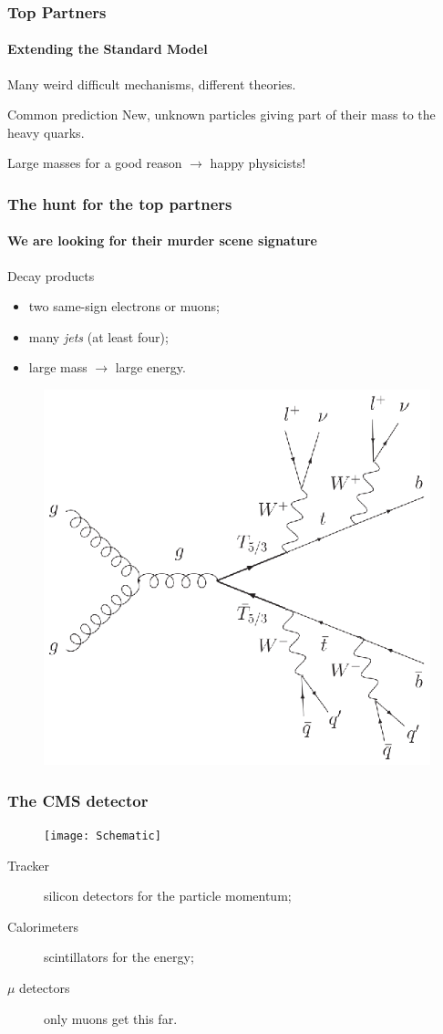 \documentclass[ukenglish]{beamer}
\begin{document}
\begin{frame}
    \frametitle{Top Partners}
    \framesubtitle{Extending the Standard Model}

    Many weird difficult mechanisms, different theories. 
    \begin{block}
        {Common prediction}
        New, unknown particles giving part of their mass to the heavy
        quarks.
    \end{block}
    Large masses for a good reason $\longrightarrow$ happy physicists!
\end{frame}

\begin{frame}
    \frametitle{The hunt for the top partners}
    \framesubtitle{We are looking for their murder scene signature}
    \begin{block}
        {Decay products}
        \begin{itemize}
            \item two same-sign electrons or muons;
            \item many \emph{jets} (at least four);
            \item large mass $\rightarrow$ large energy.
        \end{itemize}
    \end{block}
    \begin{figure}[h]
        \centering
            \includegraphics[width=.5\textwidth]{toppartner_decay}
    \end{figure}
\end{frame}

\begin{frame}
    \frametitle{The CMS detector}
    \begin{figure}[h]
        \centering
            \texttt{[image: Schematic]}
    \end{figure}
    \begin{description}
        \item[Tracker] silicon detectors for the particle momentum;
        \item[Calorimeters] scintillators for the energy;
        \item[$\mu$ detectors] only muons get this far.
    \end{description}
\end{frame}
\end{document}
